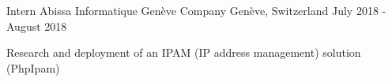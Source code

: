 \begin{cventries}
    \cventry
    {Intern} %
    {Abissa Informatique Genève Company} %
    {Genève, Switzerland} %
    {July 2018 - August 2018} %
    {
      \begin{cvitems} %
        \item {Research and deployment of an IPAM (IP address management) solution (PhpIpam)}
      \end{cvitems}
    }
\end{cventries}
